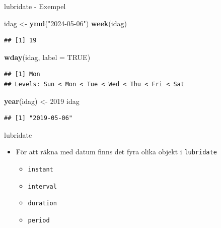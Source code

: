 \documentclass[
  11pt,
  ignorenonframetext,
  handout]{beamer}
\newenvironment{Shaded}{\begin{snugshade}}{\end{snugshade}}
\newcommand{\AttributeTok}[1]{\textcolor[rgb]{0.13,0.29,0.53}{#1}}
\newcommand{\ConstantTok}[1]{\textcolor[rgb]{0.56,0.35,0.01}{#1}}
\newcommand{\DecValTok}[1]{\textcolor[rgb]{0.00,0.00,0.81}{#1}}
\newcommand{\FunctionTok}[1]{\textcolor[rgb]{0.13,0.29,0.53}{\textbf{#1}}}
\newcommand{\NormalTok}[1]{#1}
\newcommand{\OtherTok}[1]{\textcolor[rgb]{0.56,0.35,0.01}{#1}}
\newcommand{\StringTok}[1]{\textcolor[rgb]{0.31,0.60,0.02}{#1}}
\providecommand{\tightlist}{%
  \setlength{\itemsep}{0pt}\setlength{\parskip}{0pt}}
\begin{document}
\begin{frame}[fragile]{lubridate - Exempel}
\protect{}\label{lubridate---exempel-1}
\begin{Shaded}
\begin{Highlighting}[]
\NormalTok{idag }\OtherTok{\textless{}{-}} \FunctionTok{ymd}\NormalTok{(}\StringTok{"2024{-}05{-}06"}\NormalTok{)}
\FunctionTok{week}\NormalTok{(idag)}
\end{Highlighting}
\end{Shaded}

\begin{verbatim}
## [1] 19
\end{verbatim}

\begin{Shaded}
\begin{Highlighting}[]
\FunctionTok{wday}\NormalTok{(idag, }\AttributeTok{label =} \ConstantTok{TRUE}\NormalTok{)}
\end{Highlighting}
\end{Shaded}

\begin{verbatim}
## [1] Mon
## Levels: Sun < Mon < Tue < Wed < Thu < Fri < Sat
\end{verbatim}

\begin{Shaded}
\begin{Highlighting}[]
\FunctionTok{year}\NormalTok{(idag) }\OtherTok{\textless{}{-}} \DecValTok{2019}
\NormalTok{idag}
\end{Highlighting}
\end{Shaded}

\begin{verbatim}
## [1] "2019-05-06"
\end{verbatim}
\end{frame}

\begin{frame}{lubridate}
\protect{}\label{lubridate-3}
\begin{itemize}
\tightlist
\item
  För att räkna med datum finns det fyra olika objekt i
  \texttt{lubridate}

  \begin{itemize}
  \tightlist
  \item
    \texttt{instant}
  \item
    \texttt{interval}
  \item
    \texttt{duration}
  \item
    \texttt{period}
  \end{itemize}
\end{itemize}
\end{frame}
\end{document}
